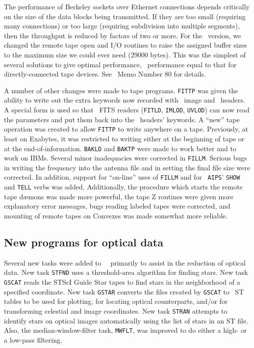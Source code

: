 The performance of Berkeley sockets over Ethernet connections depends
critically on the size of the data blocks being transmitted.  If they
are too small (requiring many connections) or too large (requiring
subdivision into multiple segments), then the throughput is reduced by
factors of two or more.  For the \RELEASENAME\ version, we changed the
remote tape open and I/O routines to raise the assigned buffer sizes
to the maximum size we could ever need (29000 bytes).  This was the
simplest of several solutions to give optimal performance, \ie\
performance equal to that for directly-connected tape devices.  See
\AIPS\ Memo Number 80 for details.

A number of other changes were made to tape programs.  {\tt FITTP} was
given the ability to write out the extra keywords now recorded with
\AIPS\ image and \uv\ headers.  A special form is used so that \AIPS\
FITS readers ({\tt FITLD}, {\tt IMLOD}, {\tt UVLOD}) can now read the
parameters and put them back into the \AIPS\ headers' keywords.  A
``new'' tape operation was created to allow {\tt FITTP} to write
anywhere on a tape.  Previously, at least on Exabytes, it was
restricted to writing either at the beginning of tape or at the
end-of-information.   {\tt BAKLD} and {\tt BAKTP} were made to work
better and to work on IBMs.  Several minor inadequacies were corrected
in {\tt FILLM}.  Serious bugs in writing the frequency into the
antenna file and in setting the final file size were corrected.  In
addition, support for ``on-line'' uses of {\tt FILLM} and for {\tt
AIPS}' {\tt SHOW} and {\tt TELL} verbs was added.  Additionally, the
procedure which starts the remote tape d\ae mons was made more
powerful, the tape Z routines were given more explanatory error
messages, bugs reading labeled tapes were corrected, and mounting of
remote tapes on Convexes was made somewhat more reliable.

\subsection{New programs for optical data}

Several new tasks were added to \RELEASENAME\ \AIPS\ primarily to
assist in the reduction of optical data.  New task {\tt STFND} uses a
threshold-area algorithm for finding stars.  New task {\tt GSCAT}
reads the STScI Guide Star tapes to find stars in the neighborhood of
a specified coordinate.  New task {\tt GSTAR} converts the files
created by {\tt GSCAT} to \AIPS\ ST tables to be used for plotting,
for locating optical counterparts, and/or for transforming celestial
and image coordinates.  New task {\tt STRAN} attempts to identify
stars on optical images automatically using the list of stars in an ST
file.  Also, the median-window-filter task, {\tt MWFLT}, was improved
to do either a high- or a low-pass filtering.

